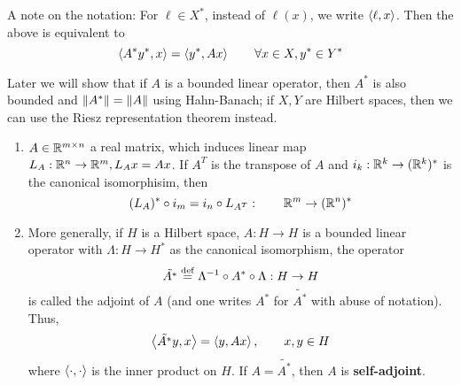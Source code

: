 \documentclass{article}
\begin{document}
A note on the notation: For \(\ell \in X^*\), instead of \(\ell(x)\), we write \(\left<{\ell},{x}\right>\). Then the above is equivalent to
\[\left<{A^* y^*},{x}\right> = \left<{y^*},{A x}\right> \qquad \forall x \in X, y^* \in Y^*\]

Later we will show that if \(A\) is a bounded linear operator, then \(A^*\) is also bounded and \(\left\|{A^*}\right\|=\left\|{A}\right\|\)
using Hahn-Banach; if \(X, Y\) are Hilbert spaces, then we can use the Riesz representation theorem instead.

\begin{example}
	\begin{enumerate}[1)]
		\item \(A \in \mathbb{R}^{m \times n}\) a real matrix, which induces linear map \(L_A: \mathbb{R}^n \to \mathbb{R}^m, L_Ax=Ax\).
		      If \(A^T\) is the transpose of \(A\) and \(i_k: \mathbb{R}^k \to (\mathbb{R}^k)^* \) is the canonical isomorphisim, then
		      \[(L_A)^* \circ i_m = i_n \circ L_{A^T}: \qquad \mathbb{R}^m \to (\mathbb{R}^n)^*\]
		\item More generally, if \(H\) is a Hilbert space, \(A: H \to H\) is a bounded linear operator with \(\Lambda: H\to H^*\) as the
		      canonical isomorphism, the operator
		      \[\tilde{A^*} \overset{\rm{def}}{=} \Lambda^{-1} \circ A^* \circ \Lambda: H \to H\]
		      is called the adjoint of \(A\) (and one writes \(A^*\) for \(\tilde{A^*}\) with abuse of notation). Thus,
		      \[\left<{\Tilde{A^*}y},{x}\right> = \left<{y},{Ax}\right>, \qquad x,y \in H\]
		      where \(\left<{\cdot},{\cdot}\right>\) is the inner product on \(H\). If \(A=\tilde{A^*}\), then \(A\) is \textbf{self-adjoint}.
	\end{enumerate}
\end{example}
\end{document}
